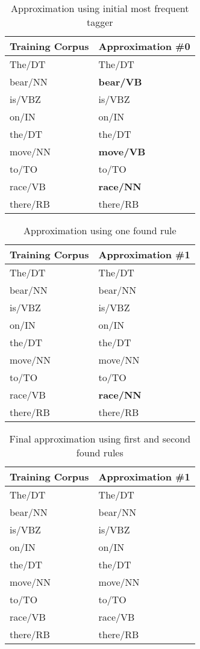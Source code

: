 \documentclass{article}
\begin{document}
\begin{table}[H]
	\centering
	\begin{tabular}{|l|l|}
		\hline
		\textbf{Training Corpus} & \textbf{Approximation \#0} \\
		\hline
		The/DT & The/DT \\
		bear/NN & \textbf{bear/VB} \\
		is/VBZ & is/VBZ \\
		on/IN & on/IN \\
		the/DT & the/DT \\
		move/NN & \textbf{move/VB} \\
		to/TO & to/TO \\
		race/VB & \textbf{race/NN} \\
		there/RB & there/RB \\
		\hline
	\end{tabular}
	\caption{Approximation using initial most frequent tagger}
	\label{transformation-tagger-example1}
\end{table}

\begin{table}[H]
	\centering
	\begin{tabular}{|l|l|}
		\hline
		\textbf{Training Corpus} & \textbf{Approximation \#1} \\
		\hline
		The/DT & The/DT \\
		bear/NN & bear/NN \\
		is/VBZ & is/VBZ \\
		on/IN & on/IN \\
		the/DT & the/DT \\
		move/NN & move/NN \\
		to/TO & to/TO \\
		race/VB & \textbf{race/NN} \\
		there/RB & there/RB \\
		\hline
	\end{tabular}
	\caption{Approximation using one found rule}
	\label{transformation-tagger-example2}
\end{table}

\begin{table}[H]
	\centering
	\begin{tabular}{|l|l|}
		\hline
		\textbf{Training Corpus} & \textbf{Approximation \#1} \\
		\hline
		The/DT & The/DT \\
		bear/NN & bear/NN \\
		is/VBZ & is/VBZ \\
		on/IN & on/IN \\
		the/DT & the/DT \\
		move/NN & move/NN \\
		to/TO & to/TO \\
		race/VB & race/VB \\
		there/RB & there/RB \\
		\hline
	\end{tabular}
	\caption{Final approximation using first and second found rules}
	\label{transformation-tagger-example3}
\end{table}
\end{document}
